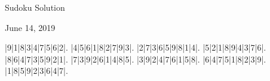 \documentclass{article}
\begin{document}
\begin{center}
\Huge{Sudoku Solution}
\end{center}
\begin{center}
\Large{June 14, 2019}
\end{center}
\begin{sudoku}
|9|1|8|3|4|7|5|6|2|.
|4|5|6|1|8|2|7|9|3|.
|2|7|3|6|5|9|8|1|4|.
|5|2|1|8|9|4|3|7|6|.
|8|6|4|7|3|5|9|2|1|.
|7|3|9|2|6|1|4|8|5|.
|3|9|2|4|7|6|1|5|8|.
|6|4|7|5|1|8|2|3|9|.
|1|8|5|9|2|3|6|4|7|.
\end{sudoku}
\end{document}
